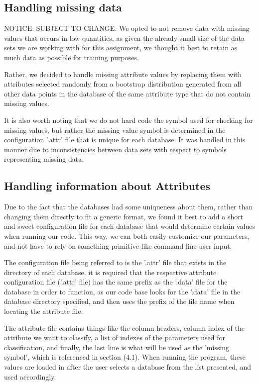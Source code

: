 \documentclass[twoside,11pt]{article}
\begin{document}
\subsection{Handling missing data} NOTICE: SUBJECT TO CHANGE.
 We opted to not remove data with missing values that occurs in low quantities, as given the already-small size of the data sets we are working with for this assignment, we thought it best to retain as much data as possible for training purposes. 

Rather, we decided to handle missing attribute values by replacing them with attributes selected randomly from a bootstrap distribution generated from all other data points in the database of the same attribute type that do not contain missing values. 

It is also worth noting that we do not hard code the symbol used for checking for missing values, but rather the missing value symbol is determined in the configuration '.attr' file that is unique for each database. It was handled in this manner due to inconsistencies between data sets with respect to symbols representing missing data.

\subsection{Handling information about Attributes}
Due to the fact that the databases had some uniqueness about them, rather than changing them directly to fit a generic format, we found it best to add a short and sweet configuration file for each database that would determine certain values when running our code. This way, we can both easily customize our parameters, and not have to rely on something primitive like command line user input. 

The configuration file being referred to is the '.attr' file that exists in the directory of each database. it is required that the respective attribute configuration file ('.attr' file) has the same prefix as the '.data' file for the database in order to function, as our code base looks for the '.data' file in the database directory specified, and then uses the prefix of the file name when locating the attribute file. 

The attribute file contains things like the column headers, column index of the attribute we want to classify, a list of indexes of the parameters used for classification, and finally, the last line is what will be used as the 'missing symbol', which is referenced in section (4.1). When running the program, these values are loaded in after the user selects a database from the list presented, and used accordingly.
\end{document}
